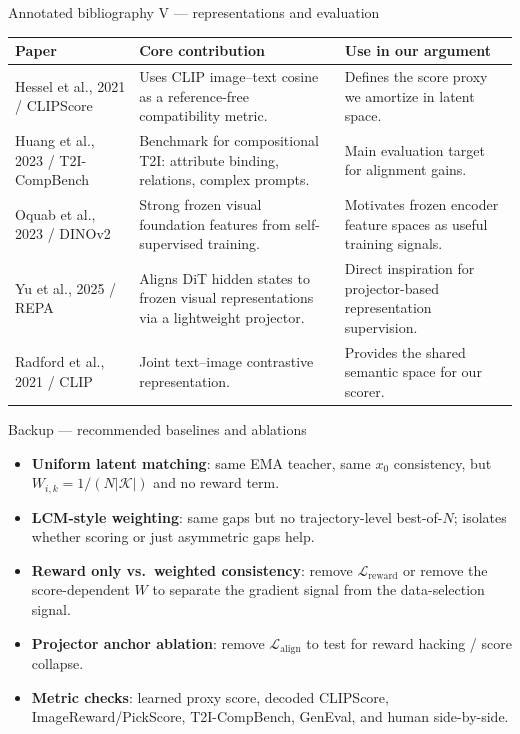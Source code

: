 \documentclass[aspectratio=169,10pt]{beamer}
\begin{document}
\begin{frame}[shrink=6]{Annotated bibliography V --- representations and evaluation}
  \scriptsize
  \begin{adjustbox}{max width=\textwidth, max height=0.80\textheight, center}
  \begin{tabular}{@{}L{0.22\textwidth}L{0.34\textwidth}L{0.34\textwidth}@{}}
    \toprule
    \textbf{Paper} & \textbf{Core contribution} & \textbf{Use in our argument} \\
    \midrule
    Hessel et al., 2021 / CLIPScore & Uses CLIP image--text cosine as a reference-free compatibility metric. & Defines the score proxy we amortize in latent space. \\
    Huang et al., 2023 / T2I-CompBench & Benchmark for compositional T2I: attribute binding, relations, complex prompts. & Main evaluation target for alignment gains. \\
    Oquab et al., 2023 / DINOv2 & Strong frozen visual foundation features from self-supervised training. & Motivates frozen encoder feature spaces as useful training signals. \\
    Yu et al., 2025 / REPA & Aligns DiT hidden states to frozen visual representations via a lightweight projector. & Direct inspiration for projector-based representation supervision. \\
    Radford et al., 2021 / CLIP & Joint text--image contrastive representation. & Provides the shared semantic space for our scorer. \\
    \bottomrule
  \end{tabular}
  \end{adjustbox}
\end{frame}

\begin{frame}[shrink=6]{Backup --- recommended baselines and ablations}
  \footnotesize
  \begin{itemize}
    \item \textbf{Uniform latent matching}: same EMA teacher, same $x_0$
      consistency, but $W_{i,k}=1/(N|\mathcal{K}|)$ and no reward term.
    \item \textbf{LCM-style weighting}: same gaps but no trajectory-level
      best-of-$N$; isolates whether scoring or just asymmetric gaps help.
    \item \textbf{Reward only vs.\ weighted consistency}: remove
      $\mathcal{L}_{\mathrm{reward}}$ or remove the score-dependent $W$ to
      separate the gradient signal from the data-selection signal.
    \item \textbf{Projector anchor ablation}: remove
      $\mathcal{L}_{\mathrm{align}}$ to test for reward hacking / score
      collapse.
    \item \textbf{Metric checks}: learned proxy score, decoded CLIPScore,
      ImageReward/PickScore, T2I-CompBench, GenEval, and human side-by-side.
  \end{itemize}
\end{frame}
\end{document}
